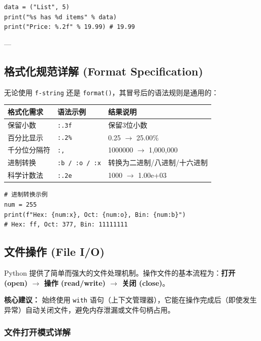 \documentclass{article}
\begin{document}
\begin{lstlisting}
data = ("List", 5)
print("%s has %d items" % data)
print("Price: %.2f" % 19.99) # 19.99
\end{lstlisting}

---

\subsection{格式化规范详解 (Format Specification)}

无论使用 \texttt{f-string} 还是 \texttt{format()}，其冒号后的语法规则是通用的：

\begin{table}[h]
\centering
\begin{tabular}{|l|l|l|}
\hline
\textbf{格式化需求} & \textbf{语法示例} & \textbf{结果说明} \\ \hline
保留小数 & \texttt{:.3f} & 保留3位小数 \\ \hline
百分比显示 & \texttt{:.2\%} & 0.25 $\rightarrow$ 25.00\% \\ \hline
千分位分隔符 & \texttt{:,} & 1000000 $\rightarrow$ 1,000,000 \\ \hline
进制转换 & \texttt{:b / :o / :x} & 转换为二进制/八进制/十六进制 \\ \hline
科学计数法 & \texttt{:.2e} & 1000 $\rightarrow$ 1.00e+03 \\ \hline
\end{tabular}
\end{table}

\begin{lstlisting}
# 进制转换示例
num = 255
print(f"Hex: {num:x}, Oct: {num:o}, Bin: {num:b}")
# Hex: ff, Oct: 377, Bin: 11111111
\end{lstlisting}

\subsection{文件操作 (File I/O)}

Python 提供了简单而强大的文件处理机制。操作文件的基本流程为：\textbf{打开 (open) $\rightarrow$ 操作 (read/write) $\rightarrow$ 关闭 (close)}。

\textbf{核心建议：} 始终使用 \texttt{with} 语句（上下文管理器），它能在操作完成后（即使发生异常）自动关闭文件，避免内存泄漏或文件句柄占用。

\subsubsection{文件打开模式详解}
\end{document}
